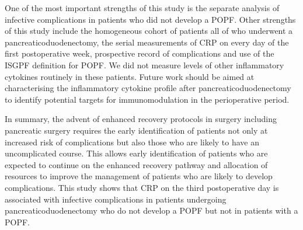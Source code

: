 One of the most important strengths of this study is the separate analysis of infective complications in patients who did not develop a POPF. 
Other strengths of this study include the homogeneous cohort of patients all of who underwent a pancreaticoduodenectomy, the serial measurements of CRP on every day of the first postoperative week, prospective record of complications and use of the ISGPF definition for POPF. 
We did not measure levels of other inflammatory cytokines routinely in these patients. 
Future work should be aimed at characterising the inflammatory cytokine profile after pancreaticoduodenectomy to identify potential targets for immunomodulation in the perioperative period. 

In summary, the advent of enhanced recovery protocols in surgery including pancreatic surgery requires the early identification of patients not only at increased risk of complications but also those who are likely to have an uncomplicated course. 
This allows early identification of patients who are expected to continue on the enhanced recovery pathway and allocation of resources to improve the management of patients who are likely to develop complications. 
This study shows that CRP on the third postoperative day is associated with infective complications in patients undergoing pancreaticoduodenectomy who do not develop a POPF but not in patients with a POPF.



